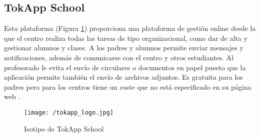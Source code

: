 \subsection{TokApp School}
Esta plataforma (Figura \ref{fig:tokapp}) proporciona una plataforma de gestión online desde la que el centro realiza todas las tareas de tipo organizacional, como dar de alta y gestionar alumnos y clases. A los padres y alumnos permite enviar mensajes y notificaciones, además de comunicarse con el centro y otros estudiantes. Al profesorado le evita el envío de circulares o documentos en papel puesto que la aplicación permite también el envío de archivos adjuntos. Es gratuita para los padres pero para los centros tiene un coste que no está especificado en su página web \cite{Educo2016}.

\begin{figure}[!h]
	\begin{center}
		\texttt{[image: /tokapp\_logo.jpg]}
		\caption{Isotipo de TokApp School}
		\label{fig:tokapp}
	\end{center}
\end{figure}

